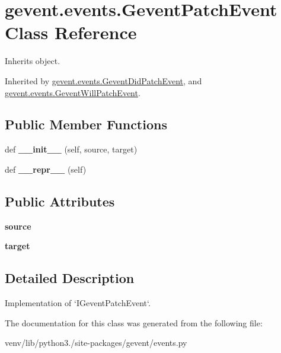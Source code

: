 \hypertarget{classgevent_1_1events_1_1_gevent_patch_event}{}\section{gevent.\+events.\+Gevent\+Patch\+Event Class Reference}
\label{classgevent_1_1events_1_1_gevent_patch_event}


Inherits object.



Inherited by \hyperlink{classgevent_1_1events_1_1_gevent_did_patch_event}{gevent.\+events.\+Gevent\+Did\+Patch\+Event}, and \hyperlink{classgevent_1_1events_1_1_gevent_will_patch_event}{gevent.\+events.\+Gevent\+Will\+Patch\+Event}.

\subsection*{Public Member Functions}
\begin{DoxyCompactItemize}
\item 
\mbox{\label{classgevent_1_1events_1_1_gevent_patch_event_a4085f715e84f3d8edf7fb535cf4f05da}} 
def {\bfseries \+\_\+\+\_\+init\+\_\+\+\_\+} (self, source, target)
\item 
\mbox{\label{classgevent_1_1events_1_1_gevent_patch_event_a8127e43b6d52b8e9675aa46d9c367aad}} 
def {\bfseries \+\_\+\+\_\+repr\+\_\+\+\_\+} (self)
\end{DoxyCompactItemize}
\subsection*{Public Attributes}
\begin{DoxyCompactItemize}
\item 
\mbox{\label{classgevent_1_1events_1_1_gevent_patch_event_a2b86fdf13d84778861f33ab9e0cc423e}} 
{\bfseries source}
\item 
\mbox{\label{classgevent_1_1events_1_1_gevent_patch_event_a206cd87c066cccfc1e86d31f7945b6be}} 
{\bfseries target}
\end{DoxyCompactItemize}


\subsection{Detailed Description}
\begin{DoxyVerb}Implementation of `IGeventPatchEvent`.
\end{DoxyVerb}
 

The documentation for this class was generated from the following file\+:\begin{DoxyCompactItemize}
\item 
venv/lib/python3./site-\/packages/gevent/events.\+py\end{DoxyCompactItemize}
